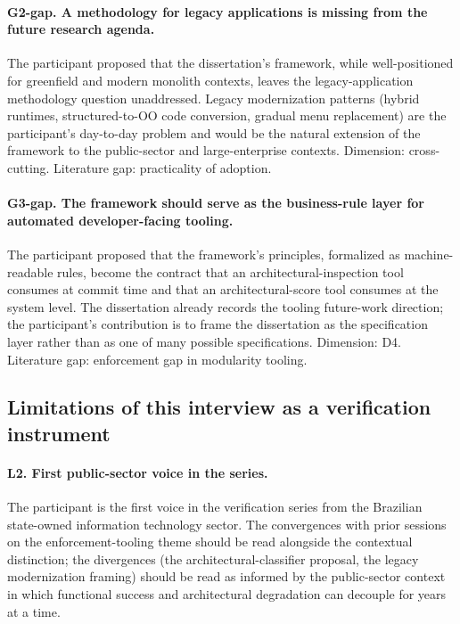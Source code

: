 \paragraph*{G2-gap. A methodology for legacy applications is missing from the future research agenda.} The participant proposed that the dissertation's framework, while well-positioned for greenfield and modern monolith contexts, leaves the legacy-application methodology question unaddressed. Legacy modernization patterns (hybrid runtimes, structured-to-OO code conversion, gradual menu replacement) are the participant's day-to-day problem and would be the natural extension of the framework to the public-sector and large-enterprise contexts. Dimension: cross-cutting. Literature gap: practicality of adoption.

\paragraph*{G3-gap. The framework should serve as the business-rule layer for automated developer-facing tooling.} The participant proposed that the framework's principles, formalized as machine-readable rules, become the contract that an architectural-inspection tool consumes at commit time and that an architectural-score tool consumes at the system level. The dissertation already records the tooling future-work direction; the participant's contribution is to frame the dissertation as the specification layer rather than as one of many possible specifications. Dimension: D4. Literature gap: enforcement gap in modularity tooling.

\subsection*{Limitations of this interview as a verification instrument}

\paragraph*{L2. First public-sector voice in the series.} The participant is the first voice in the verification series from the Brazilian state-owned information technology sector. The convergences with prior sessions on the enforcement-tooling theme should be read alongside the contextual distinction; the divergences (the architectural-classifier proposal, the legacy modernization framing) should be read as informed by the public-sector context in which functional success and architectural degradation can decouple for years at a time.

